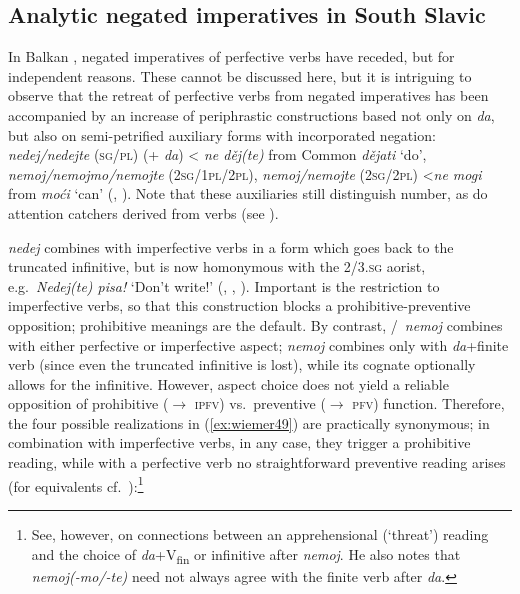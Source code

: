 \documentclass[output=paper,colorlinks,citecolor=brown]{langscibook}
\begin{document}
\subsection{Analytic negated imperatives in South Slavic}
\label{subsec:analyticnegimp}

In Balkan , negated imperatives of perfective verbs have receded, but for independent reasons. These cannot be discussed here, but it is intriguing to observe that the retreat of perfective verbs from negated imperatives has been accompanied by an increase of periphrastic constructions based not only on \textit{da}, but also on semi-petrified auxiliary forms with incorporated negation:  \textit{nedej/nedejte} (\textsc{sg/pl}) (+ \textit{da}) < \textit{ne děj(te)} from Common  \textit{dějati} `do',  \textit{nemoj/nemojmo/nemojte} (\textsc{2sg/1pl/2pl}),  \textit{nemoj/nemojte} (\textsc{2sg/2pl}) <\textit{ne mogi} from \textit{moći} `can' (\citealt{Ivić1958}, \citealt{Sedláček1997}). Note that these auxiliaries still distinguish number, as do attention catchers derived from verbs (see ).


 \textit{nedej} combines with imperfective verbs in a form which goes back to the truncated infinitive, but is now homonymous with the \textsc{2/3.sg} aorist, e.g.\ \textit{Nedej(te) pisa!} `Don't write!' (\citealt{Ivić1958}, \citealt{Sedláček1997}, \citealt[412]{Lindstedt2010}). Important is the restriction to imperfective verbs, so that this construction blocks a prohibitive-preventive opposition; prohibitive meanings are the default. By contrast, /\ \textit{nemoj} combines with either perfective or imperfective aspect;  \textit{nemoj} combines only with \textit{da}+finite verb (since even the truncated infinitive is lost), while its  cognate optionally allows for the infinitive. However, aspect choice does not yield a reliable opposition of prohibitive (${\rightarrow}$ \textsc{ipfv}) vs.\ preventive (${\rightarrow}$ \textsc{pfv}) function. Therefore, the four possible realizations in (\ref{ex:wiemer49}) are practically synonymous; in combination with imperfective verbs, in any case, they trigger a prohibitive reading, while with a perfective verb no straightforward preventive reading arises (for  equivalents cf.\ \citealt[345]{Tomić2012}):\footnote{See, however, \citet[400]{Szucsich2010} on connections between an apprehensional (`threat') reading and the choice of \textit{da}+V\textsubscript{fin} or infinitive after \textit{nemoj}. He also notes that \textit{nemoj(-mo/-te)} need not always  agree with the finite verb after \textit{da}.}
\end{document}
